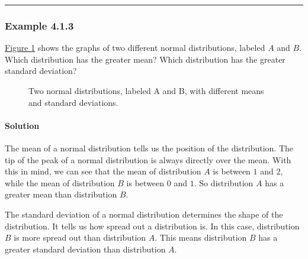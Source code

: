 \documentclass[letterpaper,10pt,english]{jupyterBook}
\begin{document}
\bigskip\hrule\bigskip



\subsubsection{Example 4.1.3}
\label{\detokenize{Ch4 The Normal Distribution and the Central Limit Theorem/4.1 Properties of the Normal Distribution:example-4-1-3}}
\sphinxAtStartPar
\hyperref[\detokenize{Ch4 The Normal Distribution and the Central Limit Theorem/4.1 Properties of the Normal Distribution:normal-ex3}]{Figure \ref{\detokenize{Ch4 The Normal Distribution and the Central Limit Theorem/4.1 Properties of the Normal Distribution:normal-ex3}}} shows the graphs of two different normal distributions, labeled \(A\) and \(B\). Which distribution has the greater mean? Which distribution has the greater standard deviation?

\begin{figure}[htbp]
\centering
\capstart

\noindent{}
\caption{Two normal distributions, labeled A and B, with different means and standard deviations.}\label{\detokenize{Ch4 The Normal Distribution and the Central Limit Theorem/4.1 Properties of the Normal Distribution:normal-ex3}}\end{figure}


\paragraph{Solution}
\label{\detokenize{Ch4 The Normal Distribution and the Central Limit Theorem/4.1 Properties of the Normal Distribution:id2}}
\sphinxAtStartPar
The mean of a normal distribution tells us the position of the distribution. The tip of the peak of a normal distribution is always directly over the mean. With this in mind, we can see that the mean of distribution \(A\) is between \(1\) and \(2\), while the mean of distribution \(B\) is between \(0\) and \(1\). So distribution \(A\) has a greater mean than distribution \(B\).

\sphinxAtStartPar
The standard deviation of a normal distribution determines the shape of the distribution. It tells us how spread out a distribution is. In this case, distribution \(B\) is more spread out than distribution \(A\). This means distribution \(B\) has a greater standard deviation than distribution \(A\).

\sphinxstepscope
\end{document}
